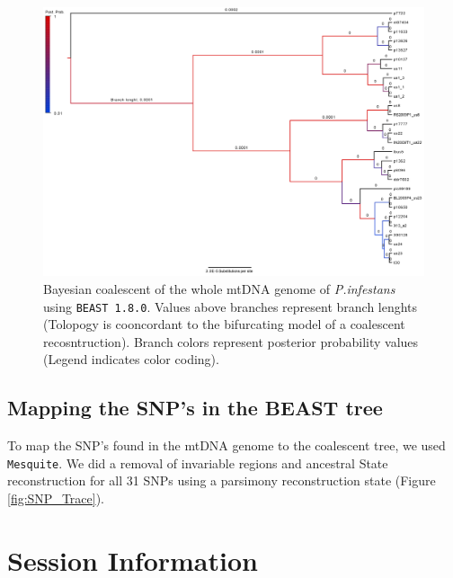 \documentclass{article}\usepackage[]{graphicx}\usepackage[]{color}
\begin{document}
\begin{figure}[h!]
\centering
\includegraphics[scale=0.3]{Beast_branchlenghts.jpg}
\caption[BEAST Coalescent tree]{Bayesian coalescent of the whole mtDNA genome of \emph{P.infestans} using \texttt{BEAST 1.8.0}. Values above branches represent branch lenghts (Tolopogy is cooncordant to the bifurcating model of a coalescent recosntruction). Branch colors represent posterior probability values (Legend indicates color coding).}
\label{fig:BEAST}
\end{figure}

\subsection{Mapping the SNP's in the BEAST tree}

To map the SNP's found in the mtDNA genome to the coalescent tree, we used \texttt{Mesquite}. We did a removal of invariable regions and ancestral State reconstruction for all 31 SNPs using a parsimony reconstruction state (Figure \ref{fig:SNP_Trace}).




\vspace{24pt}


\section{Session Information}
\end{document}
